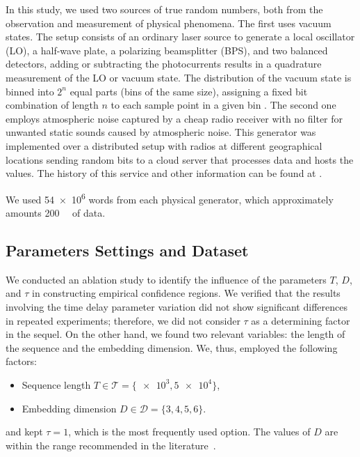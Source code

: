 \documentclass[alpha-refs]{wiley-article}
\begin{document}
In this study, we used two sources of true random numbers, both from the observation and measurement of physical phenomena.
The first uses vacuum states. 
The setup consists of an ordinary laser source to generate a local oscillator (LO), a half-wave plate, a polarizing beamsplitter (BPS), and two balanced detectors, adding or subtracting the photocurrents results in a quadrature measurement of the LO or vacuum state. 
The distribution of the vacuum state is binned into $2^n$ equal parts (bins of the same size), assigning a fixed bit combination of length $n$ to each sample point in a given bin \citep{RNGVacuumStates}. 
The second one employs atmospheric noise captured by a cheap radio receiver with no filter for unwanted static sounds caused by atmospheric noise.
This generator was implemented over a distributed setup with radios at different geographical locations sending random bits to a cloud server that processes data and hosts the values.
The history of this service and other information can be found at \citet{RandomOrg}.

We used \SI{54e6}{\byte} words from each physical generator, which approximately amounts \SI{200}{\mega\byte} of data.


\subsection{Parameters Settings and Dataset}\label{Sec:Parameters}

We conducted an ablation study to identify the influence of the parameters $T$, $D$, and $\tau$ in constructing empirical confidence regions.
We verified that the results involving the time delay parameter variation did not show significant differences in repeated experiments; therefore, we did not consider $\tau$ as a determining factor in the sequel.
On the other hand, we found two relevant variables: 
the length of the sequence 
and the embedding dimension.
We, thus, employed the following factors:
\begin{itemize}
\item Sequence length $T\in\mathcal T=\{ \num[scientific-notation=true]{e3}, \num[scientific-notation=true]{5 e4}\}$,
\item Embedding dimension $D\in\mathcal D=\{3, 4, 5, 6\}$.
\end{itemize}
and kept $\tau=1$, which is the most frequently used option.
The values of $D$ are within the range recommended in the literature~\citep{PermutationEntropyBandtPompe}.
\end{document}
